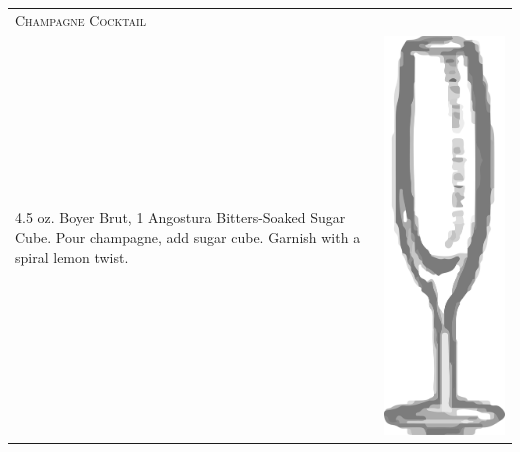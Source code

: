 \documentclass{article}
\begin{document}
\begin{tabular}{p{2in} p{0.5in}}
  \multicolumn{2}{p{3in}}{\centering\Huge\textsc{Champagne Cocktail}} \\ 
  
   \vspace{-0.1in}4.5 oz. Boyer Brut, 1 Angostura Bitters-Soaked Sugar
    Cube. Pour champagne, add sugar cube.  Garnish with a spiral lemon
    twist. &  \vspace{-0.1in} \includegraphics{flute.png}
\end{tabular}
\end{document}
